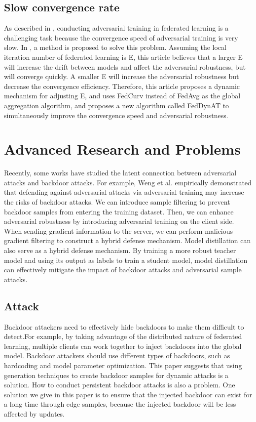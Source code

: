 \documentclass[conference]{IEEEtran}
\begin{document}
\subsection{Slow convergence rate}
As described in \cite{b34}, conducting adversarial training in federated learning is a challenging task because the convergence speed of adversarial training is very slow.
In \cite{b107}, a method is proposed to solve this problem.
Assuming the local iteration number of federated learning is E, this article believes that a larger E will
increase the drift between models and affect the adversarial robustness, but will converge quickly. A smaller
E will increase the adversarial robustness but decrease the convergence efficiency. Therefore, this article
proposes a dynamic mechanism for adjusting E, and uses FedCurv instead of FedAvg as the global aggregation
algorithm, and proposes a new algorithm called FedDynAT to simultaneously improve the convergence
speed and adversarial robustness.


\section{Advanced Research and Problems}

Recently, some works have studied the latent connection between adversarial attacks and backdoor attacks.
For example, Weng et al. \cite{b66}empirically demonstrated that defending
against adversarial attacks via adversarial training may increase the risks of backdoor attacks.
We can introduce sample filtering to prevent backdoor samples from entering the training dataset. 
Then, we can enhance adversarial robustness by introducing adversarial training on the client side. 
When sending gradient information to the server, we can perform malicious gradient filtering to construct a hybrid defense mechanism.
Model distillation can also serve as a hybrid defense mechanism. 
By training a more robust teacher model and using its output as labels to train a student model, 
model distillation can effectively mitigate the impact of backdoor attacks and adversarial sample attacks.
\subsection{Attack}  
Backdoor attackers need to effectively hide backdoors to make them difficult to detect.For example, by taking 
advantage of the distributed nature of federated learning, multiple clients can work together to inject backdoors into the global model.
Backdoor attackers should use different types of backdoors, such as hardcoding and model parameter optimization.  
This paper suggests that using generation techniques to create backdoor samples for dynamic attacks is a solution.
How to conduct persistent backdoor attacks is also a problem. 
One solution we give in this paper is to ensure that the injected backdoor can exist for a long time through edge samples, 
because the injected backdoor will be less affected by updates.
\end{document}
